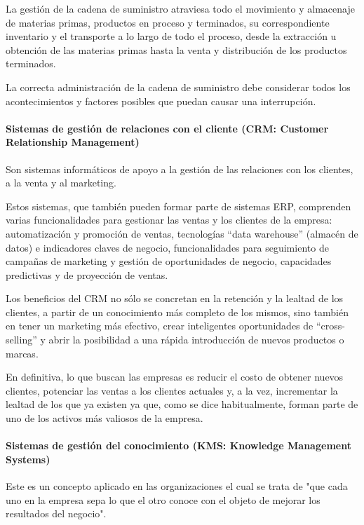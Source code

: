 \documentclass[a4paper, 12pt]{article}
\begin{document}
La gestión de la cadena de suministro atraviesa todo el movimiento y almacenaje de materias primas, productos en proceso y terminados, su correspondiente inventario y el transporte a lo largo de todo el proceso, desde la extracción u obtención de las materias primas hasta la venta y distribución de los productos terminados.

La correcta administración de la cadena de suministro debe considerar todos los acontecimientos y factores posibles que puedan causar una interrupción.

\paragraph{Sistemas de gestión de relaciones con el cliente (CRM: Customer Relationship Management)}

Son sistemas informáticos de apoyo a la gestión de las relaciones con los clientes, a la venta y al marketing.

Estos sistemas, que también pueden formar parte de sistemas ERP, comprenden varias funcionalidades para gestionar las ventas y los clientes de la empresa: automatización y promoción de ventas, tecnologías “data warehouse” (almacén de datos) e indicadores claves de negocio, funcionalidades para seguimiento de campañas de marketing y gestión de oportunidades de negocio, capacidades predictivas y de proyección de ventas.

Los beneficios del CRM no sólo se concretan en la retención y la lealtad de los clientes, a partir de un conocimiento más completo de los mismos, sino también en tener un marketing más efectivo, crear inteligentes oportunidades de “cross-selling” y abrir la posibilidad a una rápida introducción de nuevos productos o marcas.

En definitiva, lo que buscan las empresas es reducir el costo de obtener nuevos clientes, potenciar las ventas a los clientes actuales y, a la vez, incrementar la lealtad de los que ya existen ya que, como se dice habitualmente, forman parte de uno de los activos más valiosos de la empresa.

\paragraph{Sistemas de gestión del conocimiento (KMS:
Knowledge Management Systems)}

Este es un concepto aplicado en las organizaciones el cual se trata de "que cada uno en la empresa sepa lo que el otro conoce con el objeto de mejorar los resultados del negocio".
\end{document}
